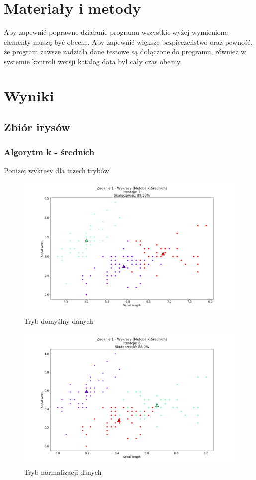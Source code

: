 \documentclass{classrep}
\begin{document}
\section{Materiały i metody}
{Aby zapewnić poprawne działanie programu wszystkie wyżej wymienione elementy muszą być obecne. Aby zapewnić większe bezpieczeństwo oraz pewność, że program zawsze zadziała dane testowe są dołączone do programu, również w systemie kontroli wersji katalog data był cały czas obecny. 
}

\section{Wyniki}
{
	\subsection{Zbiór irysów}
	{
		\subsubsection{Algorytm k - średnich}
		{
			Poniżej wykresy dla trzech trybów
				\begin{figure}[!htbp]
					\includegraphics[width=\textwidth]{wykresy/plot_k_meansIrisDefault.png}
					\caption{Tryb domyślny danych}
				\end{figure}
			
				\begin{figure}[!htbp]
					\includegraphics[width=\textwidth]{wykresy/plot_k_meansIrisNormalized.png}
					\caption{Tryb normalizacji danych}
				\end{figure}
		
}}}
\end{document}
